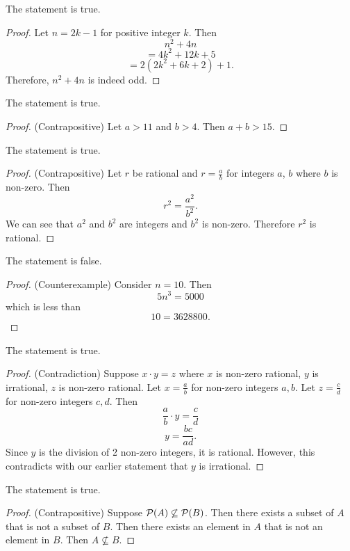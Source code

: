 \documentclass[11pt]{article}
\begin{document}
\begin{solution}
\begin{Parts}
\Part The statement is true. \begin{proof}
Let $n=2k-1$ for positive integer $k$.
Then $$n^2+4n$$
$$=4k^2+12k+5$$
$$=2(2k^2+6k+2)+1.$$
Therefore, $n^2+4n$ is indeed odd.
\end{proof}

\Part The statement is true. \begin{proof} (Contrapositive)
Let $a>11$ and $b>4$.
Then $a+b>15$.
\end{proof}

\Part The statement is true. \begin{proof} (Contrapositive)
Let $r$ be rational and $r = \frac{a}{b}$ for integers $a$, $b$ where $b$ is non-zero.
Then
$$r^2 = \frac{a^2}{b^2}.$$
We can see that $a^2$ and $b^2$ are integers and $b^2$ is non-zero.
Therefore $r^2$ is rational.
\end{proof}

\Part The statement is false. \begin{proof} (Counterexample)
Consider $n=10$. Then
$$5n^3=5000$$
which is less than
$$10=3628800.$$
\end{proof} 

\Part The statement is true. \begin{proof} (Contradiction)
Suppose $x\cdot y=z$ where $x$ is non-zero rational, $y$ is irrational, $z$ is non-zero rational.
Let $x=\frac{a}{b}$ for non-zero integers $a,b$.
Let $z=\frac{c}{d}$ for non-zero integers $c,d$.
Then $$\frac{a}{b}\cdot y=\frac{c}{d}$$
$$y=\frac{bc}{ad}.$$
Since $y$ is the division of 2 non-zero integers, it is rational.
However, this contradicts with our earlier statement that $y$ is irrational.
\end{proof}

\Part The statement is true. \begin{proof} (Contrapositive)
Suppose $\mathcal{P}(A)\not\subseteq\mathcal{P}(B)$.
Then there exists a subset of $A$ that is not a subset of $B$.
Then there exists an element in $A$ that is not an element in $B$.
Then $A\not\subseteq B$.

\end{proof}
\end{Parts}
\end{solution}

\newpage {}
\end{document}
